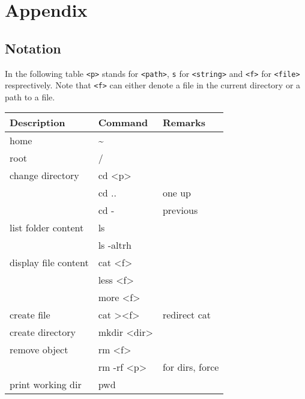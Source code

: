 \section{Appendix}
\subsection{Notation}
In the following table \texttt{<p>} stands for \texttt{<path>}, \texttt{s} for \texttt{<string>} and \texttt{<f>} for \texttt{<file>} resprectively. Note that \texttt{<f>} can either denote a file in the current directory or a path to a file.\\
{\small %
\begin{tabularx}{\linewidth}{@{} l>{\ttfamily}lX @{}}
    \toprule
    Description          & \normalfont Command        & Remarks         \\
    \midrule
    home                 & \textasciitilde{}          &                 \\
    root                 & /                          &                 \\
    change directory     & cd <p>                     &                 \\
                         & cd ..                      & one up          \\
                         & cd -                       & previous        \\
    list folder content  & ls                         &                 \\
                         & ls -altrh                  &                 \\
    display file content & cat <f>                    &                 \\
                         & less <f>                   &                 \\
                         & more <f>                   &                 \\
    create file          & cat ><f>                   & redirect cat    \\
    create directory     & mkdir <dir>                &                 \\
    remove object        & rm <f>                     &                 \\
                         & rm -rf <p>                 & for dirs, force \\
    print working dir    & pwd                        &                 \\

\end{tabularx}}
